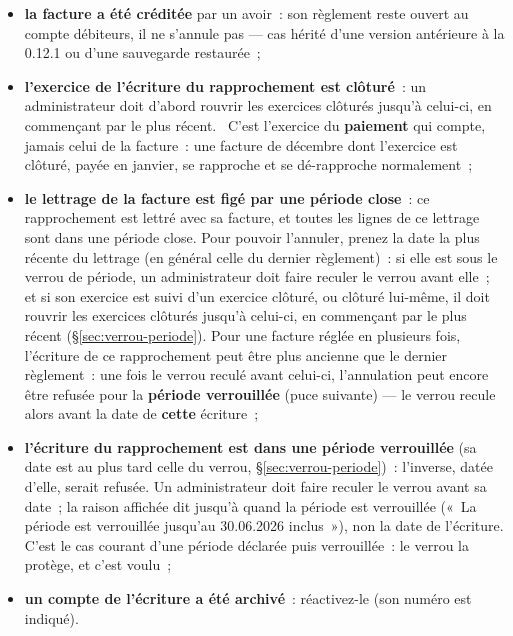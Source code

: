 \documentclass[a4paper,11pt,oneside]{article}
\begin{document}
\begin{itemize}
    \item \textbf{la facture a été créditée} par un avoir~: son règlement reste ouvert au
          compte débiteurs, il ne s'annule pas --- cas hérité d'une version antérieure à la 0.12.1
          ou d'une sauvegarde restaurée~;
    \item \textbf{l'exercice de l'écriture du rapprochement est clôturé}~: un administrateur
          doit d'abord rouvrir les exercices clôturés jusqu'à celui-ci, en commençant par le
          plus récent. \keshAttention\ C'est l'exercice du \textbf{paiement} qui compte, jamais
          celui de la facture~: une facture de décembre dont l'exercice est clôturé, payée en
          janvier, se rapproche et se dé-rapproche normalement~;
    \item \textbf{le lettrage de la facture est figé par une période close}~: ce rapprochement
          est lettré avec sa facture, et toutes les lignes de ce lettrage sont dans une période
          close. Pour pouvoir l'annuler, prenez la date la plus récente du lettrage (en général
          celle du dernier règlement)~: si elle est sous le verrou de période, un administrateur
          doit faire reculer le verrou avant elle~; et si son exercice est suivi d'un exercice
          clôturé, ou clôturé lui-même, il doit rouvrir les exercices clôturés jusqu'à
          celui-ci, en commençant par le plus récent (\S\ref{sec:verrou-periode}). Pour une
          facture réglée en plusieurs fois, l'écriture de ce rapprochement peut être plus
          ancienne que le dernier règlement~: une fois le verrou reculé avant celui-ci,
          l'annulation peut encore être refusée pour la \textbf{période verrouillée} (puce
          suivante) --- le verrou recule alors avant la date de \textbf{cette} écriture~;
    \item \textbf{l'écriture du rapprochement est dans une période verrouillée} (sa date est au
          plus tard celle du verrou, \S\ref{sec:verrou-periode})~: l'inverse, datée d'elle, serait
          refusée. Un administrateur doit faire reculer le verrou avant sa date~; la raison
          affichée dit jusqu'à quand la période est verrouillée («~La période est verrouillée
          jusqu'au 30.06.2026 inclus~»), non la date de l'écriture. C'est le cas courant d'une
          période déclarée puis verrouillée~: le verrou la protège, et c'est voulu~;
    \item \textbf{un compte de l'écriture a été archivé}~: réactivez-le (son numéro est
          indiqué).
\end{itemize}
\end{document}
